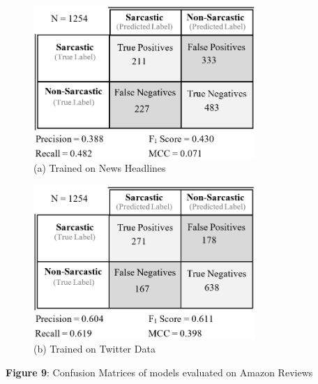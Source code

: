 \documentclass[12pt,a4paper]{article}
\begin{document}
\begin{minipage}{0.4\textwidth}
	\begin{figure}[H]
		\begin{center}
			\includegraphics[width=0.75\textwidth]{Images/cm2.png}\\
			(a) Trained on News Headlines\\
		\end{center}
	\end{figure}
\end{minipage}
\begin{minipage}{0.4\textwidth}
	\begin{figure}[H]
		\begin{center}
			\includegraphics[width=0.75\textwidth]{Images/cm1.png}\\
			(b) Trained on Twitter Data\\
		\end{center}
	\end{figure}
\end{minipage}\vspace{-15pt}

\begin{center}
	\textbf{Figure 9}: Confusion Matrices of models evaluated on Amazon Reviews
\end{center}
\end{document}
